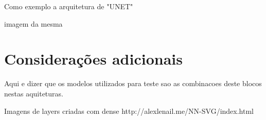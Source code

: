 Como exemplo a arquitetura de "UNET"

imagem da mesma


\section{Considerações adicionais  \label{se:dados_plus}}

Aqui e dizer que os modelos utilizados para teste sao as combinacoes deste blocos nestas aquiteturas.

Imagens de layers criadas com 
dense
http://alexlenail.me/NN-SVG/index.html
